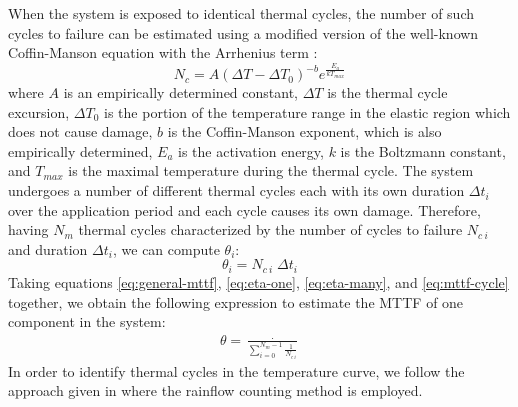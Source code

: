 When the system is exposed to identical thermal cycles, the number of such cycles to failure can be estimated using a modified version of the well-known Coffin-Manson equation with the Arrhenius term \cite{xiang2010, jedec2010}:
\[
  N_c = A (\Delta T - \Delta T_0)^{-b} e^{\frac{E_a}{k T_{max}}}
\]
where $A$ is an empirically determined constant, $\Delta T$ is the thermal cycle excursion, $\Delta T_0$ is the portion of the temperature range in the elastic region which does not cause damage, $b$ is the Coffin-Manson exponent, which is also empirically determined, $E_{a}$ is the activation energy, $k$ is the Boltzmann constant, and $T_{max}$ is the maximal temperature during the thermal cycle. The system undergoes a number of different thermal cycles each with its own duration $\Delta t_i$ over the application period and each cycle causes its own damage. Therefore, having $N_m$ thermal cycles characterized by the number of cycles to failure $N_{c\:i}$ and duration $\Delta t_i$, we can compute $\theta_i$:
\begin{equation} \label{eq:mttf-cycle}
  \theta_i = N_{c \: i} \; \Delta t_i
\end{equation}
Taking equations \eqref{eq:general-mttf}, \eqref{eq:eta-one}, \eqref{eq:eta-many}, and \eqref{eq:mttf-cycle} together, we obtain the following expression to estimate the MTTF of one component in the system:
\begin{align}
  \theta = \frac{\period}{\sum_{i=0}^{N_m - 1} \frac{1}{N_{c \: i}}}
\end{align}
In order to identify thermal cycles in the temperature curve, we follow the approach given in \cite{xiang2010} where the rainflow counting method is employed.
